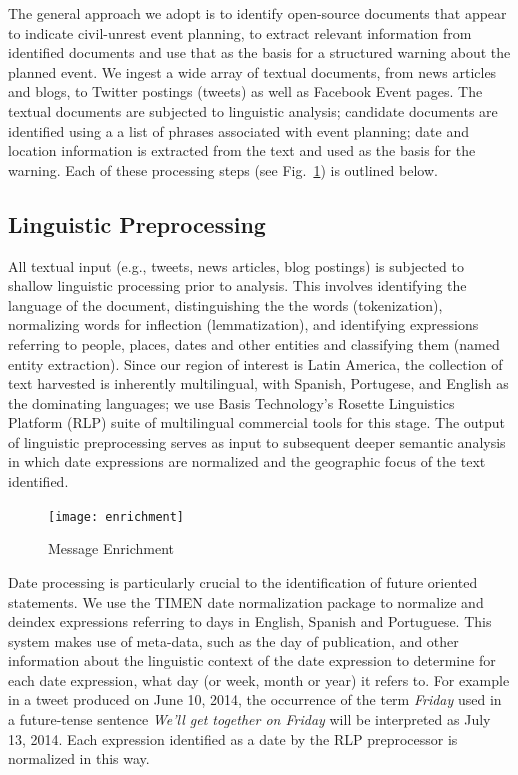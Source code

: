 The general approach we adopt is to identify open-source documents
that appear to indicate civil-unrest event planning, to extract
relevant information from identified documents and use that as the
basis for a structured warning about the planned event.  We ingest a
wide array of textual documents, from news articles and
blogs, to Twitter postings (tweets) as well as Facebook Event pages.
The textual documents are subjected to linguistic analysis; candidate
documents are identified using a a list of phrases associated with
event planning; date and location information is extracted from the
text and used as the basis for the warning.  Each of these processing
steps (see Fig.~\ref{fig:enrichment}) is outlined below.

\subsection{Linguistic Preprocessing}
All textual input (e.g., tweets, news articles, blog postings) is
subjected to shallow linguistic processing prior to analysis.  This
involves identifying the language of the document, distinguishing the
the words (tokenization), normalizing words for inflection
(lemmatization), and identifying expressions referring to people,
places, dates and other entities and classifying them (named entity extraction). 
Since our region of interest is Latin America, the collection of text
harvested is inherently multilingual, with Spanish, Portugese, and English as
the dominating languages;
we use Basis Technology's Rosette Linguistics Platform (RLP) suite of multilingual commercial tools for
this stage.
The output of linguistic preprocessing serves as input to subsequent deeper semantic analysis in which 
date expressions are normalized and the geographic focus of the text identified.

\begin{figure}
    \texttt{[image: enrichment]}
    \caption{Message Enrichment}
    \label{fig:enrichment}
\end{figure}

Date processing is particularly crucial to the identification of
future oriented statements. We use the TIMEN \cite{LlorensDGS12} date
normalization package to normalize and deindex expressions referring
to days in English, Spanish and Portuguese.  This system makes use of
meta-data, such as the day of publication, and other information about
the linguistic context of the date expression to determine for each
date expression, what day (or week, month or year) it refers to.  For
example in a tweet produced on June 10, 2014, the occurrence of the
term {\em Friday} used in a future-tense sentence {\em We'll get
  together on Friday} will be interpreted as July 13, 2014.  Each
expression identified as a date by the RLP preprocessor is normalized
in this way.

